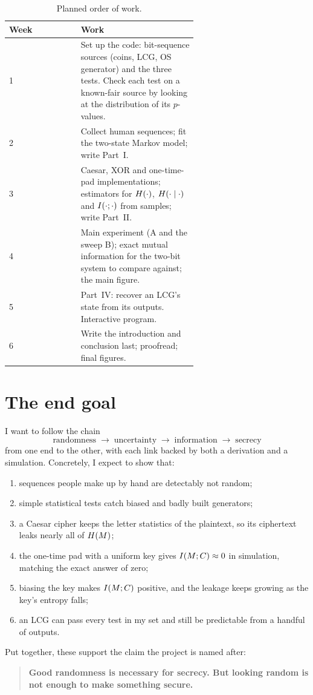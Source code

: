 \begin{table}[htbp]
  \centering
  \small
  \begin{tabular}{@{}lp{0.62\linewidth}@{}}
    \toprule
    Week & Work \\
    \midrule
    1 & Set up the code: bit-sequence sources (coins, LCG, OS generator)
        and the three tests. Check each test on a known-fair source
        by looking at the distribution of its $p$-values. \\
    2 & Collect human sequences; fit the two-state Markov model; write
        Part~I. \\
    3 & Caesar, XOR and one-time-pad implementations; estimators for
        $H\!\left(\cdot\right)$, $H\!\left(\cdot \mid \cdot\right)$ and $I\!\left(\cdot ; \cdot\right)$ from
        samples; write Part~II. \\
    4 & Main experiment (A and the sweep B); exact mutual information
        for the two-bit system to compare against; the main figure. \\
    5 & Part~IV: recover an LCG's state from its outputs. Interactive
        program. \\
    6 & Write the introduction and conclusion last; proofread; final
        figures. \\
    \bottomrule
  \end{tabular}
  \caption{Planned order of work.}
  \label{tab:plan}
\end{table}

\section{The end goal}\label{sec:goal}

I want to follow the chain
\[
  \text{randomness} \;\longrightarrow\; \text{uncertainty}
  \;\longrightarrow\; \text{information} \;\longrightarrow\; \text{secrecy}
\]
from one end to the other, with each link backed by both a derivation and a
simulation. Concretely, I expect to show that:
\begin{enumerate}
  \item sequences people make up by hand are detectably not random;
  \item simple statistical tests catch biased and badly built generators;
  \item a Caesar cipher keeps the letter statistics of the plaintext, so its
        ciphertext leaks nearly all of $H\!\left(M\right)$;
  \item the one-time pad with a uniform key gives $I\!\left(M ; C\right) \approx 0$
        in simulation, matching the exact answer of zero;
  \item biasing the key makes $I\!\left(M ; C\right)$ positive, and the leakage
        keeps growing as the key's entropy falls;
  \item an LCG can pass every test in my set and still be predictable from a
        handful of outputs.
\end{enumerate}
Put together, these support the claim the project is named after:
\begin{quote}
  \textbf{Good randomness is necessary for secrecy. But looking random is not
  enough to make something secure.}
\end{quote}
